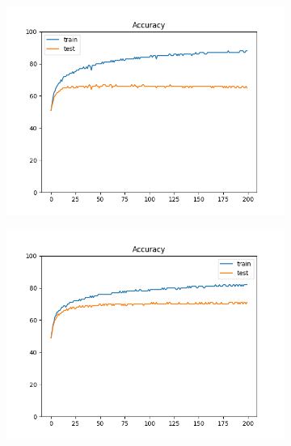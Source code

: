 \documentclass[12pt]{article}
\begin{document}
\begin{figure}
  \begin{subfigure}{0.24\textwidth}
    \centering
    \includegraphics[width=\linewidth]{accuracies_4_noaug.png}
  \end{subfigure}
  \begin{subfigure}{0.24\textwidth}
    \centering
    \includegraphics[width=\linewidth]{accuracies_4_aug.png}
  \end{subfigure}
  \begin{subfigure}{0.24\textwidth}
    \centering

\end{subfigure}
\end{figure}
\end{document}
